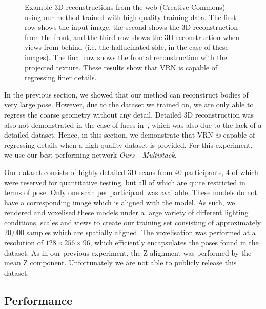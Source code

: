 \begin{figure}
\caption{Example 3D reconstructions from the web (Creative Commons)
  using our method trained with high quality training data. The first
  row shows the input image, the second shows the 3D reconstruction
  from the front, and the third row shows the 3D reconstruction when
  views from behind (i.e. the hallucinated side, in the case of these
  images). The final row shows the frontal reconstruction with the
  projected texture. These results show that VRN is capable of
  regressing finer details.}
  \label{fig:detailed}
\end{figure}

In the previous section, we showed that our method can reconstruct
bodies of very large pose. However, due to the dataset we trained on,
we are only able to regress the coarse geometry without any
detail. Detailed 3D reconstruction was also not demonstrated in the
case of faces in~\cite{jackson2017vrn}, which was also due to the lack
of a detailed dataset. Hence, in this section, we demonstrate that VRN
\textit{is} capable of regressing details when a high quality dataset
is provided. For this experiment, we use our best performing network
\textit{Ours - Multistack}.

Our dataset consists of highly detailed 3D scans from 40 participants,
4 of which were reserved for quantitative testing, but all of which
are quite restricted in terms of pose. Only one scan per participant
was available. These models do not have a corresponding image which is
aligned with the model. As such, we rendered and voxelised these
models under a large variety of different lighting conditions, scales
and views to create our training set consisting of approximately
20,000 samples which are spatially aligned.  The voxelisation was
performed at a resolution of $128\times 256\times 96$, which
efficiently encapsulates the poses found in the dataset. As in our
previous experiment, the Z alignment was performed by the mean Z
component. Unfortunately we are not able to publicly release this
dataset.

\subsection{Performance}

